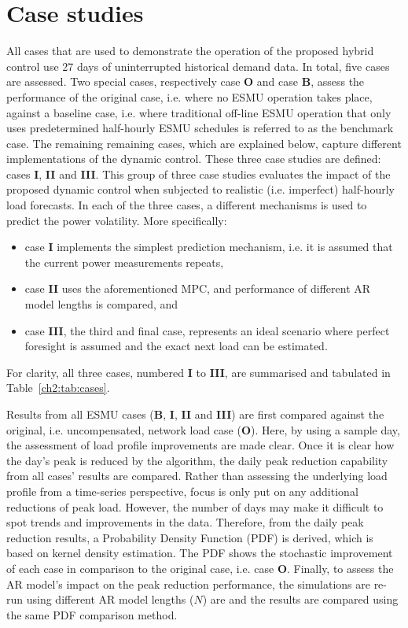 \section{Case studies}
\label{ch2:sec:case-studies}

All cases that are used to demonstrate the operation of the proposed hybrid control use 27 days of uninterrupted historical demand data.
In total, five cases are assessed.
Two special cases, respectively case \textbf{O} and case \textbf{B}, assess the performance of the original case, i.e. where no ESMU operation takes place, against a baseline case, i.e.  where traditional off-line ESMU operation that only uses predetermined half-hourly ESMU schedules is referred to as the benchmark case.
The remaining remaining cases, which are explained below, capture different implementations of the dynamic control.
These three case studies are defined: cases \textbf{I}, \textbf{II} and \textbf{III}.
This group of three case studies evaluates the impact of the proposed dynamic control when subjected to realistic (i.e. imperfect) half-hourly load forecasts.
In each of the three cases, a different mechanisms is used to predict the power volatility.
More specifically:
\begin{itemize}
	\item case \textbf{I} implements the simplest prediction mechanism, i.e. it is assumed that the current power measurements repeats,
	\item case \textbf{II} uses the aforementioned MPC, and performance of different AR model lengths is compared, and
	\item case \textbf{III}, the third and final case, represents an ideal scenario where perfect foresight is assumed and the exact next load can be estimated.
\end{itemize}
For clarity, all three cases, numbered \textbf{I} to \textbf{III}, are summarised and tabulated in Table~\ref{ch2:tab:cases}.



Results from all ESMU cases (\textbf{B}, \textbf{I}, \textbf{II} and \textbf{III}) are first compared against the original, i.e. uncompensated, network load case (\textbf{O}).
Here, by using a sample day, the assessment of load profile improvements are made clear.
Once it is clear how the day's peak is reduced by the algorithm, the daily peak reduction capability from all cases' results are compared.
Rather than assessing the underlying load profile from a time-series perspective, focus is only put on any additional reductions of peak load.
However, the number of days may make it difficult to spot trends and improvements in the data.
Therefore, from the daily peak reduction results, a Probability Density Function (PDF) is derived, which is based on kernel density estimation.
The PDF shows the stochastic improvement of each case in comparison to the original case, i.e. case \textbf{O}.
Finally, to assess the AR model's impact on the peak reduction performance, the simulations are re-run using different AR model lengths ($N$) are and the results are compared using the same PDF comparison method.
